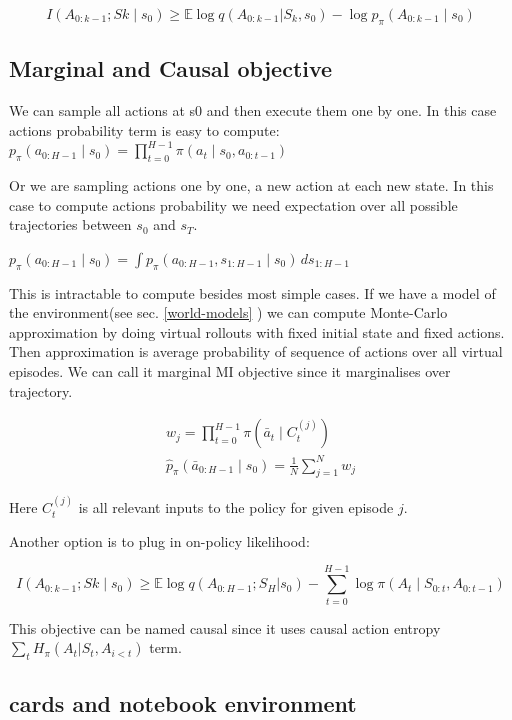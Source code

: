 \begin{equation}
	 I(A_{0:k - 1} ; Sk \mid s_0) \geq \mathbb{E} \log q(A_{0:k−1}|S_k, s_0) − \log p_π(A_{0:k−1}∣s_0​)
\end{equation}


\subsection{Marginal and Causal objective}
We can sample all actions at s0 and then execute them one by one. In this case actions probability term is easy to compute:
$p_\pi(a_{0:H-1}\mid s_0) = \prod_{t=0}^{H-1} \pi(a_t \mid s_0, a_{0:t-1})$

Or we are sampling actions one by one, a new action at each new state. In this case to compute actions probability we need expectation over all possible trajectories between $s_0$ and $s_T$.

$p_\pi(a_{0:H-1}\mid s_0) = \int
p_\pi(a_{0:H-1}, s_{1:H-1} \mid s_0)
\,ds_{1:H-1}$

This is intractable to compute besides most simple cases. If we have a model of the environment(see sec. \ref{world-models} ) we can compute Monte-Carlo approximation by doing virtual rollouts with fixed initial state and fixed actions. Then approximation is average probability of sequence of actions over all virtual episodes. We can call it marginal MI objective since it marginalises over trajectory.

\begin{equation}
\begin{aligned}
w_j=\prod_{t=0}^{H-1}
\pi(\bar a_t\mid C^{(j)}_t) \\
\widehat p_\pi(\bar a_{0:H-1}\mid s_0)=\frac1N\sum_{j=1}^{N}w_j 
\end{aligned}
\end{equation}

Here $C^{(j)}_t$ is all relevant inputs to the policy for given episode $j$.

Another option is to plug in on-policy likelihood:

\begin{equation}
I(A_{0:k - 1} ; Sk \mid s_0) \geq \mathbb{E} \log q(A_{0:H−1};S_H| s_0) − \sum_{t=0}^{H-1}\log \pi(A_t\mid S_{0:t},A_{0:t-1})
\end{equation}

This objective can be named causal since it uses causal action entropy $\sum_t H_{\pi}(A_t|S_t, A_{i<t})$ term.

\subsection{cards and notebook environment}

